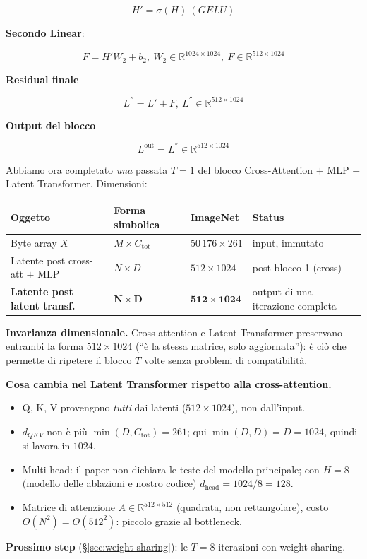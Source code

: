 \documentclass[
  11pt,
]{article}
\begin{document}
\[H' = \sigma(H)\ (GELU)\]

\textbf{Secondo Linear}:

\[F = H'W_{2} + b_{2},\ W_{2} \in \mathbb{R}^{1024 \times 1024},\ F \in \mathbb{R}^{512 \times 1024}\]

\textbf{Residual finale}

\[L^{''} = L' + F,\ L^{''} \in \mathbb{R}^{512 \times 1024}\]

\textbf{Output del blocco}

\[L^{\text{out}} = L^{''} \in \mathbb{R}^{512 \times 1024}\]

\begin{notabox}[title={\textbf{Checkpoint dimensioni --- fine \S1.4.10 (una iterazione completa)}}]
Abbiamo ora completato \emph{una} passata $T=1$ del blocco Cross-Attention $+$ MLP $+$ Latent Transformer. Dimensioni:

\medskip
\begin{center}
\begin{tabular}{@{}llll@{}}
\toprule
\textbf{Oggetto} & \textbf{Forma simbolica} & \textbf{ImageNet} & \textbf{Status} \\
\midrule
Byte array $X$ & $M \times C_{\text{tot}}$ & $50\,176 \times 261$ & input, immutato \\
Latente post cross-att $+$ MLP & $N \times D$ & $512 \times 1024$ & post blocco 1 (cross) \\
\textbf{Latente post latent transf.} & $\boldsymbol{N \times D}$ & $\mathbf{512 \times 1024}$ & output di una iterazione completa \\
\bottomrule
\end{tabular}
\end{center}

\medskip
\textbf{Invarianza dimensionale.} Cross-attention e Latent Transformer preservano entrambi la forma $512 \times 1024$ (``è la stessa matrice, solo aggiornata''): è ciò che permette di ripetere il blocco $T$ volte senza problemi di compatibilità.

\medskip
\textbf{Cosa cambia nel Latent Transformer rispetto alla cross-attention.}
\begin{itemize}\setlength\itemsep{0.1em}
\item Q, K, V provengono \emph{tutti} dai latenti ($512 \times 1024$), non dall'input.
\item $d_{QKV}$ non è più $\min(D, C_{\text{tot}}) = 261$; qui $\min(D, D) = D = 1024$, quindi si lavora in $1024$.
\item Multi-head: il paper non dichiara le teste del modello principale; con $H = 8$ (modello delle ablazioni e nostro codice) $d_{\text{head}} = 1024/8 = 128$.
\item Matrice di attenzione $A \in \mathbb{R}^{512 \times 512}$ (quadrata, non rettangolare), costo $O(N^2) = O(512^2)$: piccolo grazie al bottleneck.
\end{itemize}

\medskip
\textbf{Prossimo step} (\S\ref{sec:weight-sharing}): le $T = 8$ iterazioni con weight sharing.
\end{notabox}
\end{document}
